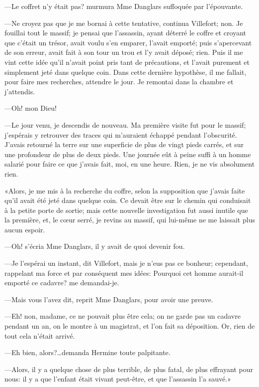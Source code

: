 —Le coffret n'y était pas? murmura Mme Danglars suffoquée par l'épouvante. 

—Ne croyez pas que je me bornai à cette tentative, continua Villefort; non. Je fouillai tout le massif; je pensai que l'assassin, ayant déterré le coffre et croyant que c'était un trésor, avait voulu s'en emparer, l'avait emporté; puis s'apercevant de son erreur, avait fait à son tour un trou et l'y avait déposé; rien. Puis il me vint cette idée qu'il n'avait point pris tant de précautions, et l'avait purement et simplement jeté dans quelque coin. Dans cette dernière hypothèse, il me fallait, pour faire mes recherches, attendre le jour. Je remontai dans la chambre et j'attendis. 

—Oh! mon Dieu! 

—Le jour venu, je descendis de nouveau. Ma première visite fut pour le massif; j'espérais y retrouver des traces qui m'auraient échappé pendant l'obscurité. J'avais retourné la terre sur une superficie de plus de vingt pieds carrés, et sur une profondeur de plus de deux pieds. Une journée eût à peine suffi à un homme salarié pour faire ce que j'avais fait, moi, en une heure. Rien, je ne vis absolument rien. 

«Alors, je me mis à la recherche du coffre, selon la supposition que j'avais faite qu'il avait été jeté dans quelque coin. Ce devait être sur le chemin qui conduisait à la petite porte de sortie; mais cette nouvelle investigation fut aussi inutile que la première, et, le cœur serré, je revins au massif, qui lui-même ne me laissait plus aucun espoir. 

—Oh! s'écria Mme Danglars, il y avait de quoi devenir fou. 

—Je l'espérai un instant, dit Villefort, mais je n'eus pas ce bonheur; cependant, rappelant ma force et par conséquent mes idées: Pourquoi cet homme aurait-il emporté ce cadavre? me demandai-je. 

—Mais vous l'avez dit, reprit Mme Danglars, pour avoir une preuve. 

—Eh! non, madame, ce ne pouvait plus être cela; on ne garde pas un cadavre pendant un an, on le montre à un magistrat, et l'on fait sa déposition. Or, rien de tout cela n'était arrivé. 

—Eh bien, alors?\dots demanda Hermine toute palpitante. 

—Alors, il y a quelque chose de plus terrible, de plus fatal, de plus effrayant pour nous: il y a que l'enfant était vivant peut-être, et que l'assassin l'a sauvé.» 

